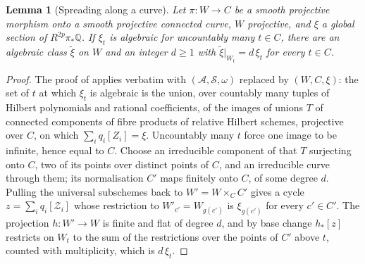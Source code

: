\documentclass[11pt,reqno]{amsart}
\theoremstyle{plain}
\newtheorem{lemma}[theorem]{Lemma}
\theoremstyle{definition}
\theoremstyle{remark}
\newcommand{\QQ}{\mathbb{Q}}
\newcommand{\cA}{\mathcal{A}}
\newcommand{\cS}{\mathcal{S}}
\newcommand{\cZ}{\mathcal{Z}}
\begin{document}
\begin{lemma}[Spreading along a curve]\label{lem:spreading}
Let $\pi\colon W\to C$ be a smooth projective morphism onto a smooth projective
connected curve, $W$ projective, and $\xi$ a global section of
$R^{2p}\pi_{*}\QQ$. If $\xi_{t}$ is algebraic for uncountably many $t\in C$,
there are an algebraic class $\tilde\xi$ on $W$ and an integer $d\ge1$ with
$\tilde\xi|_{W_{t}}=d\,\xi_{t}$ for every $t\in C$.
\end{lemma}

\begin{proof}
The proof of \cite[Theorem~16.4]{paperI} applies verbatim with $(\cA,\cS,\omega)$
replaced by $(W,C,\xi)$: the set of $t$ at which $\xi_{t}$ is algebraic is
the union, over countably many tuples of Hilbert polynomials and rational
coefficients, of the images of unions $T$ of connected components of fibre
products of relative Hilbert schemes, projective over $C$, on which
$\sum_{i}q_{i}[Z_{i}]=\xi$. Uncountably many $t$ force one image to be
infinite, hence equal to $C$. Choose an irreducible component of that $T$
surjecting onto $C$, two of its points over distinct points of $C$, and an
irreducible curve through them; its normalisation $C'$ maps finitely onto $C$,
of some degree $d$. Pulling the universal subschemes back to
$W'=W\times_{C}C'$ gives a cycle $z=\sum_{i}q_{i}[\cZ_{i}]$ whose restriction
to $W'_{c'}=W_{g(c')}$ is $\xi_{g(c')}$ for every $c'\in C'$. The projection
$h\colon W'\to W$ is finite and flat of degree $d$, and by base change
$h_{*}[z]$ restricts on $W_{t}$ to the sum of the restrictions over the
points of $C'$ above $t$, counted with multiplicity, which is $d\,\xi_{t}$.
\end{proof}
\end{document}
